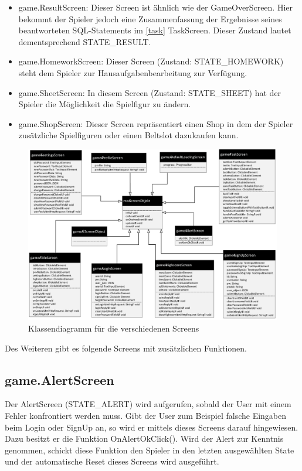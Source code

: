 \begin{itemize}
   	 \item game.ResultScreen: Dieser Screen ist \"ahnlich wie der GameOverScreen. Hier bekommt der Spieler jedoch eine Zusammenfassung
        	          der Ergebnisse seines beantworteten SQL-Statements im \ref {task} TaskScreen. Dieser Zustand lautet dementsprechend STATE\_RESULT.
   	 \item game.HomeworkScreen: Dieser Screen (Zustand: STATE\_HOMEWORK) steht dem Spieler zur Hausaufgabenbearbeitung zur Verf\"ugung.
   	 \item game.SheetScreen: In diesem Screen (Zustand: STATE\_SHEET) hat der Spieler die M\"oglichkeit die Spielfigur zu \"andern.
   	 \item game.ShopScreen: Dieser Screen repr\"asentiert einen Shop in dem der Spieler zus\"atzliche Spielfiguren oder einen Beltslot 
                  dazukaufen kann. 
\end{itemize}

\newpage
\begin{figure}[ht]
\centering
\includegraphics[width=1.0\textwidth]{figures/KLassendiagrammScreens.pdf}
\caption{Klassendiagramm für die verschiedenen Screens}
\label{MEscreen}
\end{figure}

\newpage
Des Weiteren gibt es folgende Screens mit zus\"atzlichen Funktionen.

\subsection{game.AlertScreen}
\label{Alert}
Der AlertScreen (STATE\_ALERT) wird aufgerufen, sobald der User mit einem Fehler konfrontiert werden muss. Gibt der User zum Beispiel falsche Eingaben beim
Login oder SignUp an, so wird er mittels dieses Screens darauf hingewiesen. Dazu besitzt er die Funktion OnAlertOkClick(). Wird der Alert zur Kenntnis 
genommen, schickt diese Funktion den Spieler in den letzten ausgew\"ahlten State und der automatische Reset dieses Screens wird ausgef\"uhrt.

